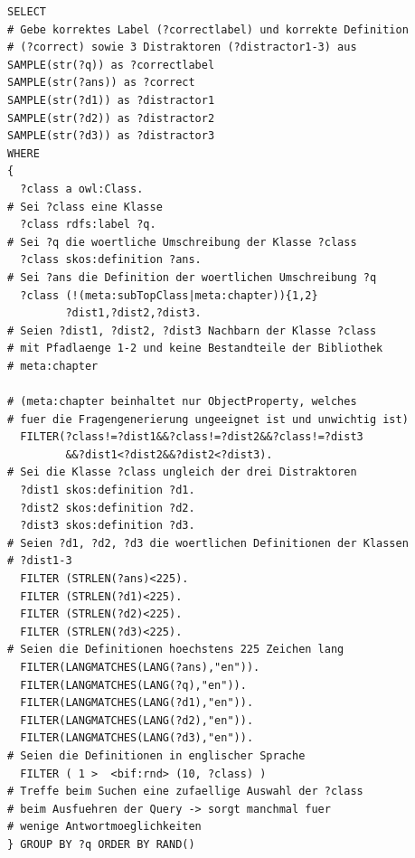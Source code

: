 \documentclass[headsepline,titlepage,ngerman,twoside,12pt]{report}
\begin{document}
\begin{lstlisting}
SELECT
# Gebe korrektes Label (?correctlabel) und korrekte Definition
# (?correct) sowie 3 Distraktoren (?distractor1-3) aus
SAMPLE(str(?q)) as ?correctlabel
SAMPLE(str(?ans)) as ?correct
SAMPLE(str(?d1)) as ?distractor1
SAMPLE(str(?d2)) as ?distractor2
SAMPLE(str(?d3)) as ?distractor3
WHERE
{
  ?class a owl:Class.
# Sei ?class eine Klasse
  ?class rdfs:label ?q.
# Sei ?q die woertliche Umschreibung der Klasse ?class
  ?class skos:definition ?ans.
# Sei ?ans die Definition der woertlichen Umschreibung ?q
  ?class (!(meta:subTopClass|meta:chapter)){1,2}
         ?dist1,?dist2,?dist3.
# Seien ?dist1, ?dist2, ?dist3 Nachbarn der Klasse ?class
# mit Pfadlaenge 1-2 und keine Bestandteile der Bibliothek
# meta:chapter

# (meta:chapter beinhaltet nur ObjectProperty, welches
# fuer die Fragengenerierung ungeeignet ist und unwichtig ist)
  FILTER(?class!=?dist1&&?class!=?dist2&&?class!=?dist3
         &&?dist1<?dist2&&?dist2<?dist3).
# Sei die Klasse ?class ungleich der drei Distraktoren
  ?dist1 skos:definition ?d1.
  ?dist2 skos:definition ?d2.
  ?dist3 skos:definition ?d3.
# Seien ?d1, ?d2, ?d3 die woertlichen Definitionen der Klassen
# ?dist1-3
  FILTER (STRLEN(?ans)<225).
  FILTER (STRLEN(?d1)<225).
  FILTER (STRLEN(?d2)<225).
  FILTER (STRLEN(?d3)<225).
# Seien die Definitionen hoechstens 225 Zeichen lang
  FILTER(LANGMATCHES(LANG(?ans),"en")).
  FILTER(LANGMATCHES(LANG(?q),"en")).
  FILTER(LANGMATCHES(LANG(?d1),"en")).
  FILTER(LANGMATCHES(LANG(?d2),"en")).
  FILTER(LANGMATCHES(LANG(?d3),"en")).
# Seien die Definitionen in englischer Sprache
  FILTER ( 1 >  <bif:rnd> (10, ?class) )
# Treffe beim Suchen eine zufaellige Auswahl der ?class
# beim Ausfuehren der Query -> sorgt manchmal fuer
# wenige Antwortmoeglichkeiten
} GROUP BY ?q ORDER BY RAND()
\end{lstlisting}
\end{document}
